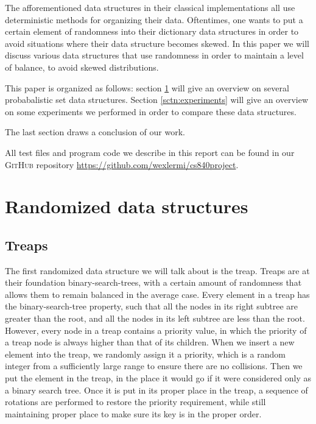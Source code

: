 \documentclass[oribibl]{llncs}
\begin{document}
The afforementioned data structures in their classical implementations all use deterministic methods for organizing their data.  Oftentimes, one wants to put a certain element of randomness into their dictionary data structures in order to avoid situations where their data structure becomes skewed. In this paper we will discuss various data structures that use randomness in order to maintain a level of balance, to avoid skewed distributions.

This paper is organized as follows: section \ref{sctn:randomized_data_structures} will give an overview on several probabalistic set data structures. Section \ref{sctn:experiments} will give an overview on some experiments we performed in order to compare these data structures.

The last section draws a conclusion of our work.

All test files and program code we describe in this report can be found in our \textsc{GitHub} repository \url{https://github.com/wexlermi/cs840project}.


\section{Randomized data structures}
\label{sctn:randomized_data_structures}

\subsection{Treaps}
The first randomized data structure we will talk about is the treap. Treaps are at their foundation binary-search-trees, with a certain amount of randomness that allows them to remain balanced in the average case. Every element in a treap has the binary-search-tree property, such that all the nodes in its right subtree are greater than the root, and all the nodes in its left subtree are less than the root. However, every node in a treap contains a priority value, in which the priority of a treap node is always higher than that of its children. When we insert a new element into the treap, we randomly assign it a priority, which is a random integer from a sufficiently large range to ensure there are no collisions. Then we put the element in the treap, in the place it would go if it were considered only as a binary search tree. Once it is put in its proper place in the treap, a sequence of rotations are performed to restore the priority requirement, while still maintaining proper place to make sure its key is in the proper order.
\end{document}
